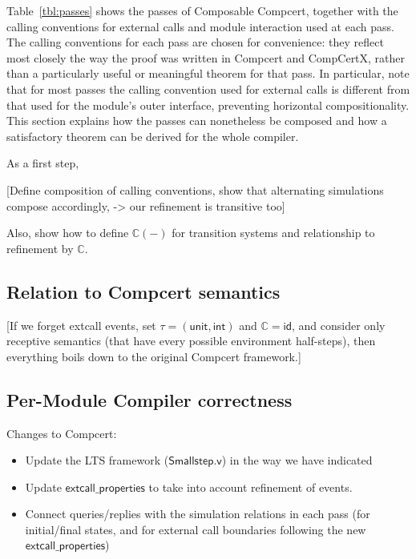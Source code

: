 \documentclass[sigplan,10pt,review,anonymous]{acmart}
\newcommand{\kw}[1]{\ensuremath{ \textsf{#1} }}
\begin{document}
Table~\ref{tbl:passes} shows the passes of Composable Compcert,
together with the calling conventions for external calls and module interaction
used at each pass.
The calling conventions for each pass are chosen for convenience:
they reflect most closely the way the proof was written
in Compcert and CompCertX,
rather than a particularly useful or meaningful theorem for that pass.
In particular,
note that for most passes
the calling convention used for external calls is different from
that used for the module's outer interface,
preventing horizontal compositionality.
This section explains how the passes can nonetheless be composed
and how a satisfactory theorem can be derived for the whole compiler.



As a first step,




[Define composition of calling conventions,
show that alternating simulations compose accordingly,
-> our refinement is transitive too]

Also, show how to define $\mathbb{C}(-)$
for transition systems
and relationship to refinement by $\mathbb{C}$.


\subsection{Relation to Compcert semantics} %

[If we forget extcall events,
set $\tau = (\kw{unit}, \kw{int})$ and $\mathbb{C} = \kw{id}$,
and consider only receptive semantics
(that have every possible environment half-steps),
then everything boils down to the original Compcert framework.]


\subsection{Per-Module Compiler correctness} %

Changes to Compcert:
\begin{itemize}
\item Update the LTS framework (\kw{Smallstep.v})
  in the way we have indicated
\item Update \kw{extcall\_properties} to take into account
  refinement of events.
\item Connect queries/replies
  with the simulation relations in each pass
  (for initial/final states, and for external call boundaries
  following the new \kw{extcall\_properties})
\end{itemize}  
\end{document}
